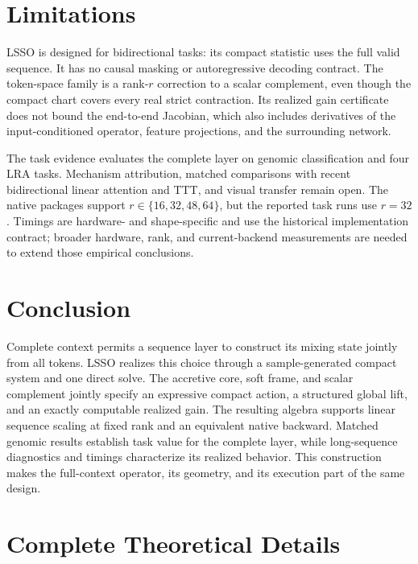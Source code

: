 \documentclass[10pt]{article}
\begin{document}
\section{Limitations}
\label{sec:limitations}

LSSO is designed for bidirectional tasks: its compact statistic uses the full
valid sequence.  It has no causal masking or autoregressive decoding contract.
The token-space family is a rank-$r$ correction to a scalar complement, even
though the compact chart covers every real strict contraction.  Its realized
gain certificate does not bound the end-to-end Jacobian, which also includes
derivatives of the input-conditioned operator, feature projections, and the
surrounding network.

The task evidence evaluates the complete layer on genomic classification and
four LRA tasks.  Mechanism attribution, matched comparisons with recent
bidirectional linear attention and TTT, and visual transfer remain open.
The native packages support $r\in\{16,32,48,64\}$, but the reported task runs
use $r=32$.  Timings are hardware- and shape-specific and use the historical
implementation contract; broader hardware, rank, and current-backend
measurements are needed to extend those empirical conclusions.

\section{Conclusion}

Complete context permits a sequence layer to construct its mixing state jointly
from all tokens.  LSSO realizes this choice through a sample-generated compact
system and one direct solve.  The accretive core, soft frame, and scalar
complement jointly specify an expressive compact action, a structured global
lift, and an exactly computable realized gain.  The resulting algebra supports
linear sequence scaling at fixed rank and an equivalent native backward.
Matched genomic results establish task value for the complete layer, while
long-sequence diagnostics and timings characterize its realized behavior.
This construction makes the full-context operator, its geometry, and its
execution part of the same design.

\appendix

\section{Complete Theoretical Details}
\label{app:proofs}
\end{document}
